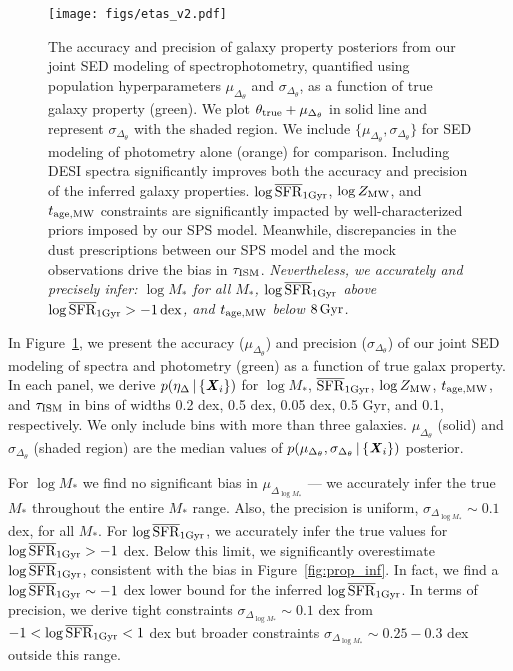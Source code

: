 \begin{figure}
\begin{center}
    \texttt{[image: figs/etas\_v2.pdf]}
    \caption{
        The accuracy and precision of galaxy property posteriors from our
        joint SED modeling of spectrophotometry, quantified using population
        hyperparameters $\mu_{\Delta_{\theta}}$ and $\sigma_{\Delta_{\theta}}$,
        as a function of true galaxy property (green). 
        We plot $\theta_{\rm true} + \mu_{\Delta_{\theta}}$ in solid line and
        represent $\sigma_{\Delta_{\theta}}$ with the shaded region.
        We include $\{\mu_{\Delta_{\theta}}, \sigma_{\Delta_{\theta}}\}$ for SED
        modeling of photometry alone (orange) for comparison. 
        Including DESI spectra significantly improves both the accuracy and
        precision of the inferred galaxy properties. 
        $\log\overline{\rm SFR}_{\rm 1Gyr}$, $\log Z_{\rm MW}$, and $t_{\rm age, MW}$ constraints are significantly
        impacted by well-characterized priors imposed by our SPS model.
        Meanwhile, discrepancies in the dust prescriptions between our SPS
        model and the mock observations drive the bias in $\tau_{\rm ISM}$.
        \emph{
            Nevertheless, we accurately and precisely infer: 
            $\log M_*$ for all $M_*$, $\log\overline{\rm SFR}_{\rm 1Gyr}$ above $\log\overline{\rm SFR}_{\rm 1Gyr} > -1\,{\rm
            dex}$, and $t_{\rm age, MW}$ below $8\,{\rm Gyr}$.
        }
        } \label{fig:etas}
\end{center}
\end{figure}

In Figure~\ref{fig:etas}, we present the accuracy ($\mu_{\Delta_{\theta}}$) and
precision ($\sigma_{\Delta_{\theta}}$) of our joint SED modeling of spectra and
photometry (green) as a function of true galax property. 
In each panel, we derive $p(\eta_\Delta \,|\, \{{\textbf{\textit{X}}_i}\})$ for 
$\log M_*$, $\overline{\rm SFR}_{\rm 1Gyr}$, $\log Z_{\rm MW}$, $t_{\rm age, MW}$, and $\tau_{\rm ISM}$ in bins of
widths 0.2 dex, 0.5 dex, 0.05 dex, 0.5 Gyr, and 0.1, respectively. 
We only include bins with more than three galaxies. 
$\mu_{\Delta_{\theta}}$ (solid) and $\sigma_{\Delta_{\theta}}$ (shaded region)
are the median values of $p(\mu_{\Delta_{\theta}}, \sigma_{\Delta_{\theta}}
\,|\, \{{\textbf{\textit{X}}_i}\})$ posterior. 

For $\log M_*$ we find no significant bias in $\mu_{\Delta_{\log M_*}}$ --- we
accurately infer the true $M_*$ throughout the entire $M_*$ range. 
Also, the precision is uniform, $\sigma_{\Delta_{\log M_*}} \sim 0.1$ dex, 
for all $M_*$. 
For $\log \overline{\rm SFR}_{\rm 1Gyr}$, we accurately infer the true values for $\log \overline{\rm SFR}_{\rm 1Gyr} > -1$
dex.
Below this limit, we significantly overestimate $\log \overline{\rm SFR}_{\rm 1Gyr}$, consistent with
the bias in Figure~\ref{fig:prop_inf}. 
In fact, we find a $\log \overline{\rm SFR}_{\rm 1Gyr} \sim -1$ dex lower bound for the inferred
$\log \overline{\rm SFR}_{\rm 1Gyr}$. 
In terms of precision, we derive tight constraints $\sigma_{\Delta_{\log M_*}}
\sim 0.1$ dex from $-1 < \log \overline{\rm SFR}_{\rm 1Gyr} < 1$ dex but broader constraints
$\sigma_{\Delta_{\log M_*}} \sim 0.25 - 0.3$ dex outside this range. 

